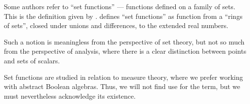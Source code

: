 \begin{remark}\label{rem:set_function}
  Some authors refer to \enquote{set functions} --- functions defined on a family of sets. This is the definition given by .  defines \enquote{set functions} as function from a \enquote{rings of sets}, closed under unions and differences, to the extended real numbers.

  Such a notion is meaningless from the perspective of set theory, but not so much from the perspective of analysis, where there is a clear distinction between points and sets of scalars.

  Set functions are studied in relation to measure theory, where we prefer working with abstract Boolean algebras. Thus, we will not find use for the term, but we must nevertheless acknowledge its existence.
\end{remark}

